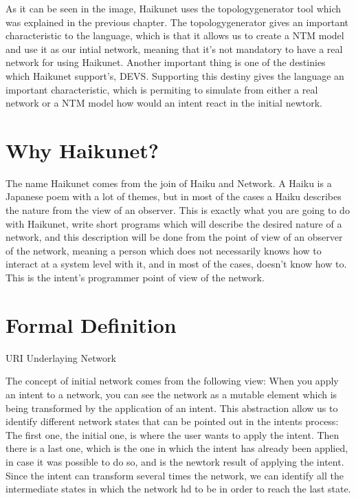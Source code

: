 As it can be seen in the image, Haikunet uses the topologygenerator tool which was explained in the previous chapter. The topologygenerator gives an important characteristic to the language, which is that it allows us to create a NTM model and use it as our intial network, meaning that it's not mandatory to have a real network for using Haikunet. Another important thing is one of the destinies which Haikunet support's, DEVS. Supporting this destiny gives the language an important characteristic, which is permiting to simulate from either a real network or a NTM model how would an intent react in the initial newtork.

\section{Why Haikunet?}

The name Haikunet comes from the join of Haiku and Network. A Haiku is a Japanese poem with a lot of themes, but in most of the cases a Haiku describes the nature from the view of an observer. This is exactly what you are going to do with Haikunet, write short programs which will describe the desired nature of a network, and this description will be done from the point of view of an observer of the network, meaning a person which does not necessarily knows how to interact at a system level with it, and in most of the cases, doesn't know how to. This is the intent's programmer point of view of the network. 

\section{Formal Definition}

URI Underlaying Network

The concept of initial network comes from the following view: When you apply an intent to a network, you can see the network as a mutable element which is being transformed by the application of an intent. This abstraction allow us to identify different network states that can be pointed out in the intents process: The first one, the initial one, is where the user wants to apply the intent. Then there is a last one, which is the one in which the intent has already been applied, in case it was possible to do so, and is the newtork result of applying the intent. Since the intent can transform several times the network, we can identify all the intermediate states in which the network hd to be in order to reach the last state. 

